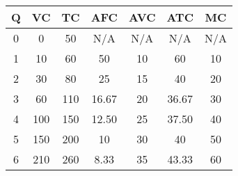 \begin{table}[]
    \centering
    \begin{tabular}{ccccccc}
    \hline
    Q & VC  & TC  & AFC   & AVC & ATC   & MC  \\
    \hline
    0 & 0   & 50  & N/A   & N/A & N/A   & N/A  \\
    1 & 10  & 60  & 50    & 10  & 60    & 10  \\
    2 & 30  & 80  &  25   & 15  &  40   & 20 \\
    3 & 60  & 110 & 16.67 & 20  & 36.67 & 30  \\
    4 & 100 & 150 & 12.50 & 25  & 37.50 & 40 \\
    5 & 150 & 200 &   10  & 30  &   40  & 50 \\
    6 & 210 & 260 & 8.33  & 35  & 43.33 & 60  \\
    \hline
    \end{tabular}
\end{table}
